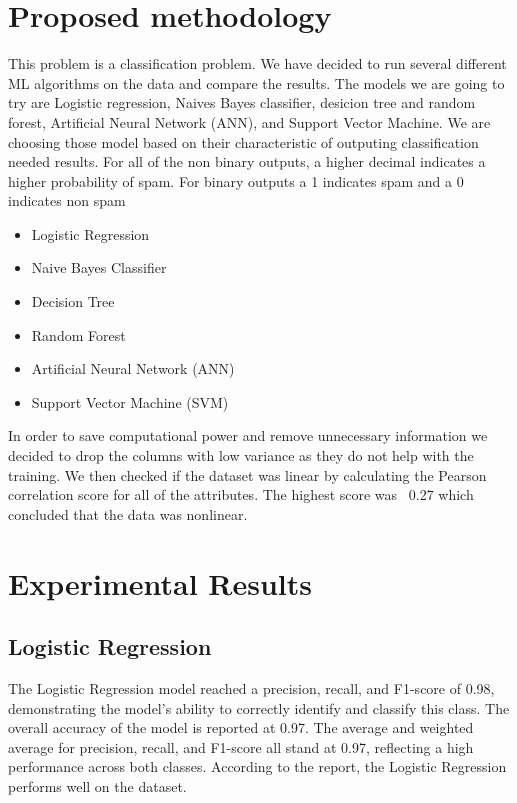 \documentclass[conference]{IEEEtran}
\begin{document}
\newpage
\section{\textbf{Proposed methodology}}

This problem is a classification problem. We have decided to run several different ML algorithms on the data and compare the results. The models we are going to try are Logistic regression, Naives Bayes classifier, desicion tree and random forest, Artificial Neural Network (ANN), and Support Vector Machine. We are choosing those model based on their characteristic of outputing classification needed results. For all of the non binary outputs, a higher decimal indicates a higher probability of spam. For binary outputs a 1 indicates spam and a 0 indicates non spam
\begin{itemize}
    \item Logistic Regression
    \item Naive Bayes Classifier
    \item Decision Tree
    \item Random Forest
    \item Artificial Neural Network (ANN)
    \item Support Vector Machine (SVM)
    
 \end{itemize}

In order to save computational power and remove unnecessary information we decided to drop the columns with low variance as they do not help with the training. We then checked if the dataset was linear by calculating the Pearson correlation score for all of the attributes. The highest score was ~0.27 which concluded that the data was nonlinear.

\newpage
\section{\textbf{Experimental Results}}

\subsection{\textbf{Logistic Regression}}

The Logistic Regression model reached a precision, recall, and F1-score of 0.98, demonstrating the model's ability to correctly identify and classify this class. The overall accuracy of the model is reported at 0.97. The average and weighted average for precision, recall, and F1-score all stand at 0.97, reflecting a high performance across both classes. According to the report, the Logistic Regression performs well on the dataset.
\end{document}
